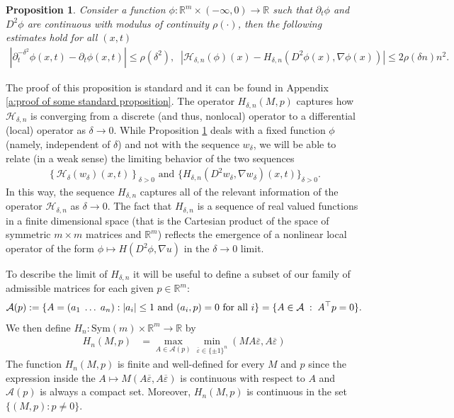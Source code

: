 \documentclass[reqno]{amsart}
\newtheorem{proposition}[theorem]{Proposition}
\numberwithin{equation}{section}
\begin{document}
\begin{proposition}\label{p:consistency of discretization}
  Consider a function $\phi:\mathbb{R}^m\times (-\infty,0)\to\mathbb{R}$ such that $\partial_t\phi$ and $D^2\phi$ are continuous with modulus of continuity $\rho(\cdot)$, then the following estimates hold for all $(x,t)$
  \begin{align*}
    |\partial^{-\delta^2}_t\phi(x,t)-\partial_t \phi(x,t)| \leq \rho(\delta^2), \;\;|\mathcal{H}_{\delta,n}(\phi)(x)-H_{\delta,n}(D^2\phi(x),\nabla \phi(x))| \leq 2\rho(\delta n)n^2.
  \end{align*}

\end{proposition}

The proof of this proposition is standard and it can be found in Appendix \ref{a:proof of some standard proposition}. The operator $H_{\delta,n}(M,p)$ captures how $\mathcal{H}_{\delta,n}$ is converging from a discrete (and thus, nonlocal) operator to a differential (local) operator as $\delta \to 0$. While Proposition \ref{p:consistency of discretization} deals with a fixed function $\phi$ (namely, independent of $\delta$) and not with the sequence $w_\delta$, we will be able to relate (in a weak sense) the limiting behavior of the two sequences 
\begin{align*}
  \left \{\mathcal{H}_{\delta}(w_\delta)(x,t)\right \}_{\delta>0} \text{ and } \{ H_{\delta,n}(D^2w_\delta,\nabla w_\delta)(x,t) \}_{\delta>0}.    
\end{align*}
In this way, the sequence $H_{\delta,n}$ captures all of the relevant information of the operator $\mathcal{H}_{\delta,n}$ as $\delta \to 0$. The fact that $H_{\delta,n}$ is a sequence of real valued functions in a finite dimensional space (that is the Cartesian product of the space of symmetric $m\times m$ matrices and $\mathbb{R}^m$) reflects the emergence of a nonlinear local operator of the form $\phi \mapsto H(D^2\phi,\nabla u)$ in the $\delta \to 0$ limit. 

To describe the limit of $H_{\delta,n}$ it will be useful to define a subset of our family of admissible matrices for each given $p\in\mathbb{R}^m$:
\begin{align}\label{e:definition of the set A of p}
  \mathcal{A}(p) := \{ A = (a_1 \;\ldots\;a_n) : |a_i|\leq 1 \textnormal{ and } (a_i,p)=0 \textnormal{ for all } i\} = \{ A \in \mathcal{A}\;:\; A^\top p = 0\}.
\end{align}
We then define $H_n:\text{Sym}(m)\times \mathbb{R}^m\to \mathbb{R}$ by
\begin{align}\label{e:definition of the operator Hn}
  H_n(M,p) & = \max_{A \in \mathcal{A}(p)} \min_{\overline \varepsilon \in \{\pm 1\}^n} (MA\overline\varepsilon,A\overline\varepsilon)
\end{align}
The function $H_n(M,p)$ is finite and well-defined for every $M$ and $p$  since the expression inside the $A\mapsto M(A\overline \varepsilon,A\overline\varepsilon)$ is continuous with respect to $A$ and $\mathcal{A}(p)$ is always a compact set. Moreover, $H_n(M,p)$ is continuous in the set $\{ (M,p): p \neq 0\}$.
\end{document}
